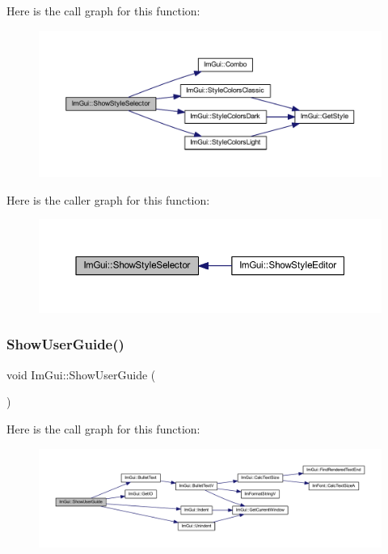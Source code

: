 Here is the call graph for this function\+:
\nopagebreak
\begin{figure}[H]
\begin{center}
\leavevmode
\includegraphics[width=350pt]{namespace_im_gui_a83f4e863c102b0a05e0e3308b371b394_cgraph}
\end{center}
\end{figure}
Here is the caller graph for this function\+:
\nopagebreak
\begin{figure}[H]
\begin{center}
\leavevmode
\includegraphics[width=350pt]{namespace_im_gui_a83f4e863c102b0a05e0e3308b371b394_icgraph}
\end{center}
\end{figure}
\mbox{\label{namespace_im_gui_ad6f4919bc9aa806ca8d2c1d6e2bfb051}} 
\subsubsection{\texorpdfstring{Show\+User\+Guide()}{ShowUserGuide()}}
{\footnotesize\ttfamily void Im\+Gui\+::\+Show\+User\+Guide (\begin{DoxyParamCaption}{ }\end{DoxyParamCaption})}

Here is the call graph for this function\+:
\nopagebreak
\begin{figure}[H]
\begin{center}
\leavevmode
\includegraphics[width=350pt]{namespace_im_gui_ad6f4919bc9aa806ca8d2c1d6e2bfb051_cgraph}
\end{center}
\end{figure}
\mbox{\label{namespace_im_gui_ae8e2043e5d630169423e2d14a913afa1}} 
